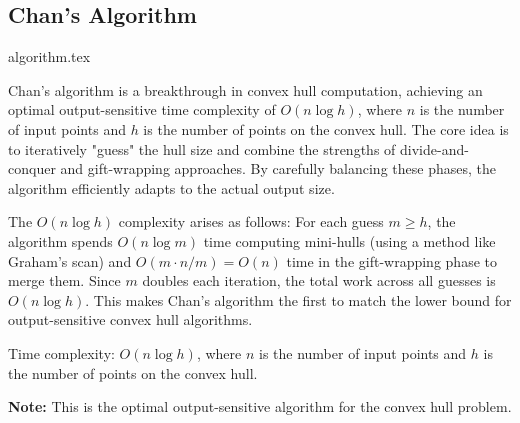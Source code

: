 \clearpage
\subsection{Chan's Algorithm}
\label{ssec:chans_algorithm}

{algorithm.tex}
\label{algorithm:chans_algorithm}

\begin{insight}
Chan's algorithm is a breakthrough in convex hull computation, achieving an optimal output-sensitive time complexity of $O(n \log h)$, where $n$ is the number of input points and $h$ is the number of points on the convex hull. The core idea is to iteratively "guess" the hull size and combine the strengths of divide-and-conquer and gift-wrapping approaches. By carefully balancing these phases, the algorithm efficiently adapts to the actual output size.
\end{insight}

\begin{mathinsight}
The $O(n \log h)$ complexity arises as follows: For each guess $m \geq h$, the algorithm spends $O(n \log m)$ time computing mini-hulls (using a method like Graham's scan) and $O(m \cdot n/m) = O(n)$ time in the gift-wrapping phase to merge them. Since $m$ doubles each iteration, the total work across all guesses is $O(n \log h)$. This makes Chan's algorithm the first to match the lower bound for output-sensitive convex hull algorithms.
\end{mathinsight}



\begin{complexity}
\label{comp:chans_algorithm}
Time complexity: $O(n \log h)$, where $n$ is the number of input points and $h$ is the number of points on the convex hull.
\end{complexity}

\textbf{Note:} This is the optimal output-sensitive algorithm for the convex hull problem.